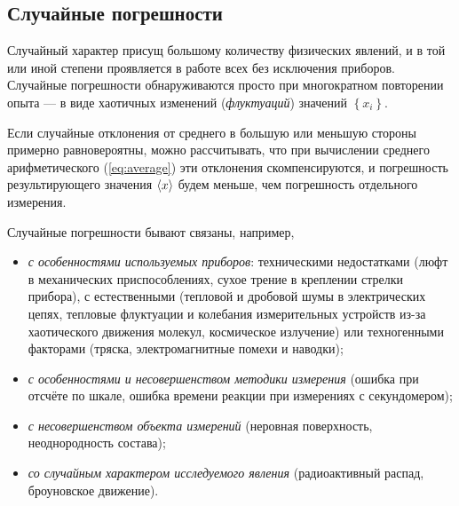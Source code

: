 
\subsection{Случайные погрешности}

Случайный характер присущ большому количеству физических
явлений, и в той или иной степени проявляется в работе всех без исключения
приборов. Случайные погрешности обнаруживаются просто при многократном
повторении опыта --- в виде хаотичных изменений (\emph{флуктуаций})
значений $\left\{ x_{i}\right\} $.

Если случайные отклонения от среднего в большую или меньшую стороны
примерно равновероятны, можно рассчитывать, что при вычислении среднего
арифметического (\ref{eq:average}) эти отклонения скомпенсируются,
и погрешность результирующего значения $\left<x\right>$ будем меньше,
чем погрешность отдельного измерения.

Случайные погрешности бывают связаны, например,
\begin{itemize}\small
    \item \emph{с особенностями используемых приборов}: техническими
недостатками
(люфт в механических приспособлениях, сухое трение в креплении стрелки
прибора), с естественными (тепловой и дробовой шумы в электрических
цепях, тепловые флуктуации и колебания измерительных устройств из-за
хаотического движения молекул, космическое излучение) или техногенными
факторами (тряска, электромагнитные помехи и наводки);

    \item \emph{с особенностями и несовершенством методики измерения} (ошибка
при отсчёте по шкале, ошибка времени реакции при измерениях с секундомером);

    \item \emph{с несовершенством объекта измерений} (неровная поверхность,
неоднородность состава);

    \item \emph{со случайным характером исследуемого явления} (радиоактивный
распад, броуновское движение).
\end{itemize}

